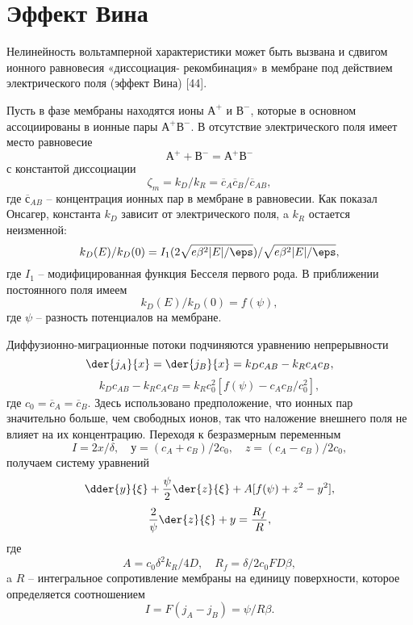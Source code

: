 \section{Эффект Вина}
Нелинейность вольтамперной характеристики может быть вызвана и сдвигом ионного
равновесия «диссоциация- рекомбинация» в мембране под действием электрического
поля (эффект Вина) [44].

Пусть в фазе мембраны находятся ионы \( А^+ \) и \( В^- \), которые в основном
ассоциированы в ионные пары \( А^+В^- \). В отсутствие электрического поля имеет
место равновесие
\[
    А^+ + В^- = А^+В^-
\]
с константой диссоциации
\[
    \zeta_m = k_D/k_R = \overline{c}_A\overline{c}_B/\overline{c}_{AB},
\]
где \( \overline{с}_{AB} \) -- концентрация ионных пар в мембране в равновесии.
Как показал Онсагер, константа \( k_D \) зависит от электрического поля, a
\( k_R \) остается неизменной:
\begin{equation}
    k_D(E) / k_D(0) = I_1(2\sqrt{e\beta^2|E|/\eps}) / \sqrt{e\beta^2|E|/\eps},
\end{equation}
где \( I_1 \) -- модифицированная функция Бесселя первого рода. В приближении
постоянного поля имеем
\[
    k_D(E) / k_D(0) = f(\psi),
\]
где \( \psi \) -- разность потенциалов на мембране.

Диффузионно-миграционные потоки подчиняются уравнению непрерывности
\begin{equation}
    \der{j_A}{x} = \der{j_B}{x} = k_D c_{AB} - k_R c_A c_B,
\end{equation}
\[
    k_D c_{AB} - k_R c_A c_B = k_R c_0^2 [f(\psi) - c_A c_B / c_0^2],
\]
где \( c_0 = \overline{c}_A = \overline{c}_B \). Здесь использовано
предположение, что ионных пар значительно больше, чем свободных ионов, так что
наложение внешнего поля не влияет на их концентрацию. Переходя к безразмерным
переменным
\[
    I = 2x/\delta,\quad у = (c_A + c_B) / 2c_0,\quad z = (c_A - c_B) /2c_0,
\]
получаем систему уравнений
\begin{equation}
    \dder{y}{\xi} + \frac{\psi}{2}\der{z}{\xi} + A[f(\psi) + z^2 - y^2],
\end{equation}
\[
    \frac{2}{\psi}\der{z}{\xi} + y = \frac{R_f}{R},
\]
где
\[
    A = c_0\delta^2k_R/4D,\quad R_f = \delta/2c_0 FD\beta,
\]
a \( R \) -- интегральное сопротивление мембраны на единицу поверхности, которое
определяется соотношением
\[
    I = F(j_A - j_B) = \psi/R\beta.
\]

